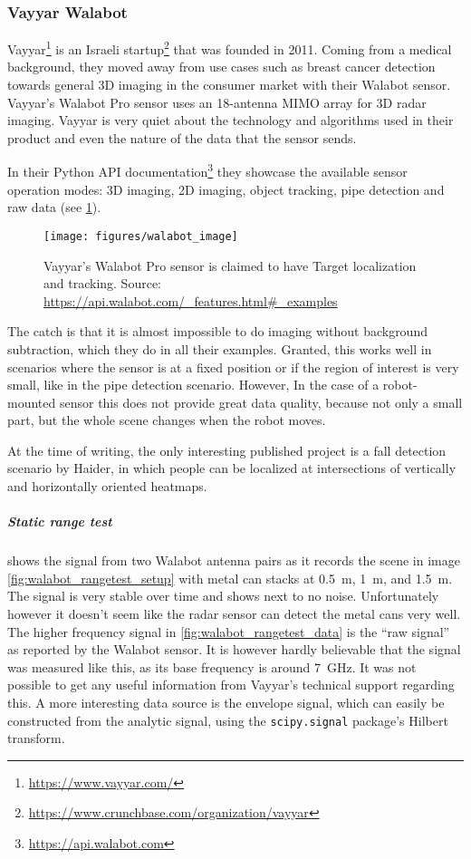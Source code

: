 \subsubsection{Vayyar Walabot}\label{walabot}

Vayyar\footnote{\url{https://www.vayyar.com/}} is an Israeli
startup\footnote{\url{https://www.crunchbase.com/organization/vayyar}} that was founded in 2011. Coming from a medical background, they moved away from use cases such as breast cancer detection towards general 3D imaging in the consumer market with their Walabot sensor. Vayyar's Walabot Pro sensor uses an 18-antenna MIMO array for 3D radar imaging. Vayyar is very quiet about the technology and algorithms used in their product and even the nature of the data that the sensor sends.

In their Python API documentation\footnote{\url{https://api.walabot.com}} they showcase the available sensor operation modes: 3D imaging, 2D imaging, object tracking, pipe detection and raw data (see \cref{fig:walabot_image}).

\begin{figure}[htbp]
    \centering
    \texttt{[image: figures/walabot\_image]}
    \caption{Vayyar's Walabot Pro sensor is claimed to have Target localization and tracking. Source: \url{https://api.walabot.com/\_features.html\#\_examples}}
    \label{fig:walabot_image}
\end{figure}

The catch is that it is almost impossible to do imaging without background subtraction, which they do in all their examples. Granted, this works well in scenarios where the sensor is at a fixed position or if the region of interest is very small, like in the pipe detection scenario. However, In the case of a robot-mounted sensor this does not provide great data quality, because not only a small part, but the whole scene changes when the robot moves.

At the time of writing, the only interesting published project is a fall detection scenario \cite{Haider2017} by Haider, in which people can be localized at intersections of vertically and horizontally oriented heatmaps.

\subparagraph{Static range test}\label{static-range-test}

 shows the signal from two Walabot antenna pairs as it records the scene in image \cref{fig:walabot_rangetest_setup} with metal can stacks at \SI{0.5}{m}, \SI{1}{m}, and \SI{1.5}{m}. The signal is very stable over time and shows next to no noise. Unfortunately however it doesn't seem like the radar sensor can detect the metal cans very well. The higher frequency signal in \cref{fig:walabot_rangetest_data} is the ``raw signal'' as reported by the Walabot sensor. It is however hardly believable that the signal was measured like this, as its base frequency is around \SI{7}{GHz}. It was not possible to get any useful information from Vayyar's technical support regarding this. A more interesting data source is the envelope signal, which can easily be constructed from the analytic signal, using the \texttt{scipy.signal} package's Hilbert transform.

